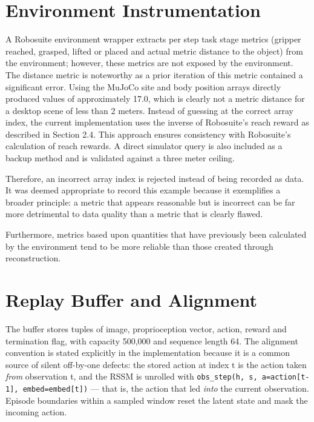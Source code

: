 \documentclass[12pt,a4paper,oneside]{report}
\begin{document}
\hypertarget{environment-instrumentation}{%
\section{Environment Instrumentation}\label{environment-instrumentation}}
A Robosuite environment wrapper extracts per step task stage metrics (gripper reached, grasped, lifted or placed and actual metric distance to the object) from the environment; however, these metrics are not exposed by the environment. The distance metric is noteworthy as a prior iteration of this metric contained a significant error. Using the MuJoCo site and body position arrays directly produced values of approximately 17.0, which is clearly not a metric distance for a desktop scene of less than 2 meters. Instead of guessing at the correct array index, the current implementation uses the inverse of Robosuite's reach reward as described in Section 2.4. This approach ensures consistency with Robosuite's calculation of reach rewards. A direct simulator query is also included as a backup method and is validated against a three meter ceiling.

Therefore, an incorrect array index is rejected instead of being recorded as data. It was deemed appropriate to record this example because it exemplifies a broader principle: a metric that appears reasonable but is incorrect can be far more detrimental to data quality than a metric that is clearly flawed.

Furthermore, metrics based upon quantities that have previously been calculated by the environment tend to be more reliable than those created through reconstruction.

\hypertarget{replay-buffer-and-alignment}{%
\section{Replay Buffer and Alignment}\label{replay-buffer-and-alignment}}

The buffer stores tuples of image, proprioception vector, action, reward and
termination flag, with capacity 500,000 and sequence length 64. The alignment
convention is stated explicitly in the implementation because it is a common
source of silent off-by-one defects: the stored action at index t is the
action taken \emph{from} observation t, and the RSSM is unrolled with
\texttt{obs\_step(h,\ s,\ a=action{[}t-1{]},\ embed=embed{[}t{]})} --- that is, the action that led
\emph{into} the current observation. Episode boundaries within a sampled window reset
the latent state and mask the incoming action.
\end{document}
